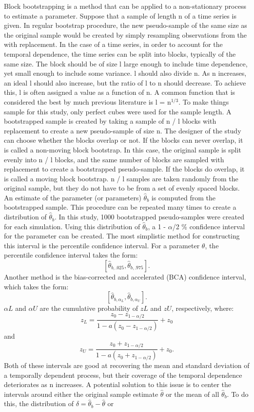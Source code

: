\documentclass[12pt, letterpaper, titlepage]{article}
\begin{document}
Block bootstrapping is a method that can be applied to a non-stationary process to estimate a parameter. Suppose that a sample of length n of a time series is given. In regular bootstrap procedure, the new pseudo-sample of the same size as the original sample would be created by simply resampling observations from the with replacement. In the case of a time series, in order to account for the temporal dependence, the time series can be split into blocks, typically of the same size. The block should be of size l large enough to include time dependence, yet small enough to include some variance. l should also divide n. As n increases, an ideal l should also increase, but the ratio of l to n should decrease. To achieve this, l is often assigned a value as a function of n. A common function that is considered the best by much previous literature is l = n$^{1/3}$. To make things sample for this study, only perfect cubes were used for the sample length. A bootstrapped sample is created by taking a sample of n / l blocks with replacement to create a new pseudo-sample of size n. The designer of the study can choose whether the blocks overlap or not. If the blocks can never overlap, it is called a non-moving block bootstrap. In this case, the original sample is split evenly into n / l blocks, and the same number of blocks are sampled with replacement to create a bootstrapped pseudo-sample. If the blocks do overlap, it is called a moving block bootstrap. n / l samples are taken randomly from the original sample, but they do not have to be from a set of evenly spaced blocks. An estimate of the parameter (or parameters) $\hat{\theta}_{b}$ is computed from the bootstrapped sample. This procedure can be repeated many times to create a distribution of $\hat{\theta}_{b}$. In this study, 1000 bootstrapped pseudo-samples were created for each simulation. Using this distribution of $\hat{\theta}_{b}$, a 1 - $\alpha$/2 \% confidence interval for the parameter can be created. The most simplistic method for constructing this interval is the percentile confidence interval. For a parameter $\theta$, the percentile confidence interval takes the form: \[ [\hat{\theta}_{b, .025}, \hat{\theta}_{b, .975}].\] Another method is the bias-corrected and accelerated 
(BCA) confidence interval, which takes the form: \[ [\hat{\theta}_{b, \alpha_{L}}, \hat{\theta}_{b, \alpha_{U}}].\] $\alpha{L}$ and $\alpha{U}$ are the cumulative probability of $z{L}$ and $z{U}$, respectively, where:
\[z_{L} = \frac{z_{0} - z_{1 - \alpha/2}}{1 - a(z_{0} - z_{1 - \alpha/2})} + z_{0}\] and
\[z_{U} = \frac{z_{0} + z_{1 - \alpha/2}}{1 - a(z_{0} + z_{1 - \alpha/2})} + z_{0}.\] 
	Both of these intervals are good at recovering the mean and standard deviation of a temporally dependent process, but their coverage of the temporal dependence deteriorates as n increases. A potential solution to this issue is to center the intervals around either the original sample estimate $\hat{\theta}$ or the mean of all $\hat{\theta}_{b}$. To do this, the distribution of $\delta = \hat{\theta}_{b} - \hat{\theta}$ or 
\end{document}
